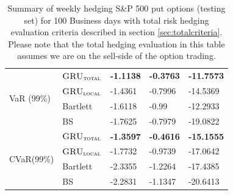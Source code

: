 \documentclass[letterpaper,12pt,titlepage,oneside,final]{book}
\numberwithin{equation}{section}
\theoremstyle{definition}
\newcommand{\modelT}{\textsc{GRU}_{\textsc{total}}}
\newcommand{\modelL}{\textsc{GRU}_{\textsc{local}}}
\begin{document}
\begin{table}[htp!]
\begin{tabular}{ll|l|l|l|}
		\hline
		\multicolumn{1}{|l|}{\multirow{4}{*}{VaR (99\%)}}     & $\modelT$    & \textbf{-1.1138} & \textbf{-0.3763} & \textbf{-11.7573} \\  
		\multicolumn{1}{|l|}{}                                & $\modelL$    & -1.4361          & -0.7996          & -14.5369           \\ 
		\multicolumn{1}{|l|}{}                                & Bartlett 	 & -1.6118  		 &-0.99   		   &-12.2933         \\  
		\multicolumn{1}{|l|}{}                                & BS       	 & -1.7625  		&-0.7979 		   &-19.0822          \\ 
		\hline
		\multicolumn{1}{|l|}{\multirow{4}{*}{CVaR(99\%)}}     & $\modelT$    & \textbf{-1.3597} & \textbf{-0.4616} & \textbf{-15.1555} \\  
		\multicolumn{1}{|l|}{}                                & $\modelL$    & -1.7732          & -0.9739          & -17.0642         \\ 
		\multicolumn{1}{|l|}{}                                & Bartlett     &-2.3355  			&-1.2264 		   &-17.4385          \\ 
		\multicolumn{1}{|l|}{}                                & BS       	 & -2.2831  		&-1.1347 		   &-20.6413          \\ \hline
	\end{tabular}
	\caption{Summary of weekly hedging S\&P 500 put options (testing set) for 100 Business days with total risk hedging evaluation criteria described in section \ref{sec:totalcriteria}. Please note that the total hedging evaluation in this table assumes we are on the sell-side of the option trading.} \label{table:putTotalW}
\end{table}
\end{document}

